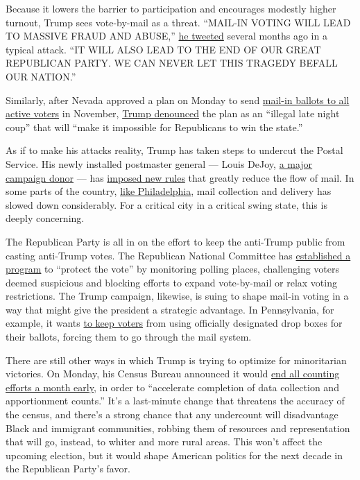 Because it lowers the barrier to participation and encourages modestly
higher turnout, Trump sees vote-by-mail as a threat. ``MAIL-IN VOTING
WILL LEAD TO MASSIVE FRAUD AND ABUSE,''
\href{https://twitter.com/realdonaldtrump/status/1266172570983940101?s=21}{he
tweeted} several months ago in a typical attack. ``IT WILL ALSO LEAD TO
THE END OF OUR GREAT REPUBLICAN PARTY. WE CAN NEVER LET THIS TRAGEDY
BEFALL OUR NATION.''

Similarly, after Nevada approved a plan on Monday to send
\href{https://www.cnn.com/2020/08/03/politics/nevada-mail-ballots-registered-voters/index.html}{mail-in
ballots to all active voters} in November,
\href{https://twitter.com/realdonaldtrump/status/1290250416278532096?s=21}{Trump
denounced} the plan as an ``illegal late night coup'' that will ``make
it impossible for Republicans to win the state.''

As if to make his attacks reality, Trump has taken steps to undercut the
Postal Service. His newly installed postmaster general --- Louis DeJoy,
\href{https://www.nytimes3xbfgragh.onion/2020/07/31/us/politics/trump-usps-mail-delays.html}{a
major campaign donor} --- has
\href{https://www.washingtonpost.com/business/2020/07/14/postal-service-trump-dejoy-delay-mail/}{imposed
new rules} that greatly reduce the flow of mail. In some parts of the
country, \href{https://t.co/MPqSHlXP1P}{like Philadelphia}, mail
collection and delivery has slowed down considerably. For a critical
city in a critical swing state, this is deeply concerning.

The Republican Party is all in on the effort to keep the anti-Trump
public from casting anti-Trump votes. The Republican National Committee
has
\href{https://www.nytimes3xbfgragh.onion/2020/05/18/us/Voting-republicans-trump.html}{established
a program} to ``protect the vote'' by monitoring polling places,
challenging voters deemed suspicious and blocking efforts to expand
vote-by-mail or relax voting restrictions. The Trump campaign, likewise,
is suing to shape mail-in voting in a way that might give the president
a strategic advantage. In Pennsylvania, for example, it wants
\href{https://www.inquirer.com/politics/election/trump-campaign-lawsuit-pennsylvania-mail-ballots-20200629.html}{to
keep voters} from using officially designated drop boxes for their
ballots, forcing them to go through the mail system.

There are still other ways in which Trump is trying to optimize for
minoritarian victories. On Monday, his Census Bureau announced it would
\href{https://www.npr.org/2020/08/03/898548910/census-cut-short-a-month-rushes-to-finish-all-counting-efforts-by-sept-30}{end
all counting efforts a month early}, in order to ``accelerate completion
of data collection and apportionment counts.'' It's a last-minute change
that threatens the accuracy of the census, and there's a strong chance
that any undercount will disadvantage Black and immigrant communities,
robbing them of resources and representation that will go, instead, to
whiter and more rural areas. This won't affect the upcoming election,
but it would shape American politics for the next decade in the
Republican Party's favor.

